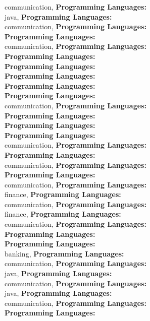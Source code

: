 communication, \textbf{Programming Languages:} \\
java, \textbf{Programming Languages:} \\
communication, \textbf{Programming Languages:} \\
\textbf{Programming Languages:} \\
communication, \textbf{Programming Languages:} \\
\textbf{Programming Languages:} \\
\textbf{Programming Languages:} \\
\textbf{Programming Languages:} \\
\textbf{Programming Languages:} \\
\textbf{Programming Languages:} \\
communication, \textbf{Programming Languages:} \\
\textbf{Programming Languages:} \\
\textbf{Programming Languages:} \\
\textbf{Programming Languages:} \\
communication, \textbf{Programming Languages:} \\
\textbf{Programming Languages:} \\
communication, \textbf{Programming Languages:} \\
\textbf{Programming Languages:} \\
communication, \textbf{Programming Languages:} \\
finance, \textbf{Programming Languages:} \\
communication, \textbf{Programming Languages:} \\
finance, \textbf{Programming Languages:} \\
communication, \textbf{Programming Languages:} \\
\textbf{Programming Languages:} \\
\textbf{Programming Languages:} \\
banking, \textbf{Programming Languages:} \\
communication, \textbf{Programming Languages:} \\
java, \textbf{Programming Languages:} \\
communication, \textbf{Programming Languages:} \\
java, \textbf{Programming Languages:} \\
communication, \textbf{Programming Languages:} \\
\textbf{Programming Languages:} \\
